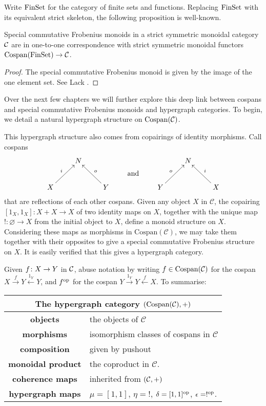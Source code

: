 Write $\mathrm{FinSet}$ for the category of finite sets and functions. Replacing
$\mathrm{FinSet}$ with its equivalent strict skeleton, the following proposition is
well-known. 
\begin{proposition} \label{prop.cospanscfm}
  Special commutative Frobenius monoids in a strict symmetric monoidal category
$\mathcal C$ are in one-to-one correspondence with strict symmetric monoidal functors
$\operatorname{{Cospan}}(\mathrm{FinSet}) \to \mathcal C$.
\end{proposition}
\begin{proof}
  The special commutative Frobenius monoid is given by the image of the one
  element set. See Lack \cite{Lac04}.
\end{proof}
Over the next few chapters we will further explore this deep link between
cospans and special commutative Frobenius monoids and hypergraph categories. To
begin, we detail a natural hypergraph structure on $\operatorname{{Cospan}}(\mathcal C)$. 

This hypergraph structure also comes from copairings of identity morphisms.
Call cospans 
\[
  \xymatrix{
    & N \\
    X \ar[ur]^{i} && Y \ar[ul]_{o}
  }
  \qquad \xymatrix@R=8pt{\\\textrm{and}} \qquad 
  \xymatrix{
    & N \\
    Y \ar[ur]^{o} && X \ar[ul]_{i}
  }
\]
that are reflections of each other  cospans. Given any object
$X$ in $\mathcal C$, the copairing $[1_X,1_X]\colon  X + X \to X$ of two identity
maps on $X$, together with the unique map $!\colon  \varnothing \to X$ from the
initial object to $X$, define a monoid structure on $X$. Considering these
maps as morphisms in $\mathrm{Cospan(\mathcal C)}$, we may take them together
with their opposites to give a special commutative Frobenius structure on $X$.
It is easily verified that this gives a hypergraph category.

Given $f {\colon} X \to Y$ in $\mathcal C$, abuse notation by writing $f \in
\mathrm{Cospan}(\mathcal C)$ for the cospan $X \stackrel{f}\to Y
\stackrel{1_Y}\leftarrow Y$, and $f^{\mathrm{op}}$ for the cospan $Y \stackrel{1_Y}\to Y
\stackrel{f}\leftarrow X$. To summarise:
  \begin{center}
  \begin{tabular}{ |c| p{}|}
      \hline
      \multicolumn{2}{|c|}{The hypergraph category $(\mathrm{Cospan(\mathcal C)},+)$} \\
    \hline
    \textbf{objects} & the objects of $\mathcal C$ \\ 
    \textbf{morphisms} & isomorphism classes of cospans in
    $\mathcal C$\\ 
  \textbf{composition} & given by pushout \\
  \textbf{monoidal product} & the coproduct in $\mathcal C$. \\
  \textbf{coherence maps} & inherited from $(\mathcal C,+)$\\
  \textbf{hypergraph maps} & $\mu = [1,1]$, $\eta = !$,
  $\delta = [1,1]^{\mathrm{op}}$, $\epsilon = !^{\mathrm{op}}$. \\
      \hline
  \end{tabular}
\end{center}
   
